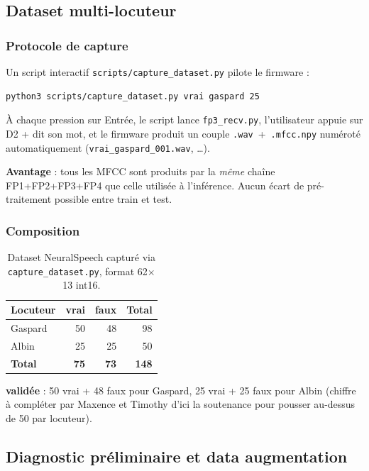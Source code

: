 \subsection{Dataset multi-locuteur}

\subsubsection{Protocole de capture}

Un script interactif \texttt{scripts/capture\_dataset.py} pilote le firmware :
\begin{verbatim}
python3 scripts/capture_dataset.py vrai gaspard 25
\end{verbatim}
\noindent À chaque pression sur Entrée, le script lance \texttt{fp3\_recv.py}, l'utilisateur appuie sur D2 + dit son mot, et le firmware produit un couple \texttt{.wav}~+~\texttt{.mfcc.npy} numéroté automatiquement (\texttt{vrai\_gaspard\_001.wav}, \dots).

\textbf{Avantage} : tous les MFCC sont produits par la \emph{même} chaîne FP1+FP2+FP3+FP4 que celle utilisée à l'inférence. Aucun écart de pré-traitement possible entre train et test.

\subsubsection{Composition}

\begin{table}[H]
\centering
\small
\begin{tabularx}{0.7\linewidth}{@{}l r r r@{}}
\toprule
\textbf{Locuteur} & \textbf{vrai} & \textbf{faux} & \textbf{Total} \\
\midrule
Gaspard & 50 & 48 & 98 \\
Albin   & 25 & 25 & 50 \\
\midrule
\textbf{Total} & \textbf{75} & \textbf{73} & \textbf{148} \\
\bottomrule
\end{tabularx}
\caption{Dataset NeuralSpeech capturé via \texttt{capture\_dataset.py}, format 62$\times$13 int16.}
\label{tab:fp5-dataset}
\end{table}

\noindent\textbf{ validée} : 50 vrai + 48 faux pour Gaspard, 25 vrai + 25 faux pour Albin (chiffre à compléter par Maxence et Timothy d'ici la soutenance pour pousser au-dessus de 50 par locuteur).

\subsection{Diagnostic préliminaire et data augmentation}

